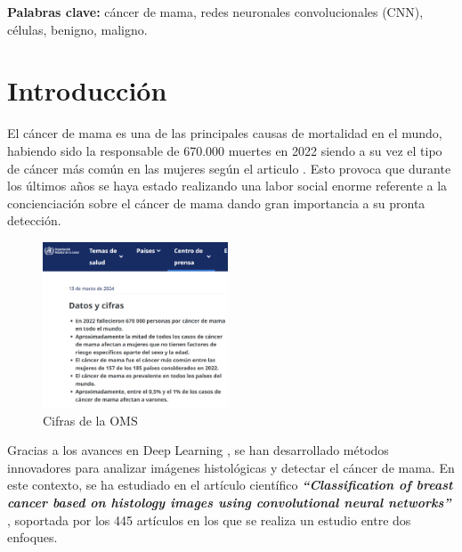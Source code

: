 \documentclass[12pt]{article} %
\begin{document}
\vspace{.5cm}

\textbf{Palabras clave:} cáncer de mama, redes neuronales convolucionales (CNN), células, benigno, maligno.

\newpage
\tableofcontents

\newpage

\section{Introducción}
El cáncer de mama es una de las principales causas de mortalidad en el mundo, habiendo sido la responsable de 670.000 muertes en 2022 siendo a su vez el tipo de cáncer más común en las mujeres según el articulo \cite{who_breast_cancer}. Esto provoca que durante los últimos años se haya estado realizando una labor social enorme referente a la concienciación sobre el cáncer de mama dando gran importancia a su pronta detección.\\

\begin{figure}[!ht]
    \centering
    \includegraphics[width=0.49\textwidth]{introduccion.png}
    \caption{Cifras de la OMS \cite{who_breast_cancer}}
    \label{fig:OMS}
\end{figure}

Gracias a los avances en Deep Learning \cite{shinde2018review}, se han desarrollado métodos innovadores para analizar imágenes histológicas y detectar el cáncer de mama. En este contexto, se ha estudiado en el artículo científico \textit{\textbf{“Classification of breast cancer based on histology images using convolutional neural networks”}} \cite{bardou2018classification}, soportada por los 445 artículos en los que se realiza un estudio entre dos enfoques.\\
\end{document}
